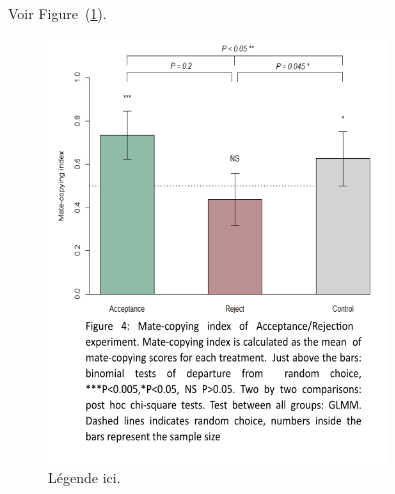 \documentclass[a4paper, 12pt]{article}
\begin{document}
	Voir Figure~(\ref{fig:histogramme-mcs}).

	\begin{figure}
		\centering
		\includegraphics[width=0.8\textwidth]{images/histogramme-mcs}
		\caption{Légende ici.}
		\label{fig:histogramme-mcs}
	\end{figure}



\clearpage
\newrefcontext[sorting=nyt] %
\printbibliography
\end{document}
